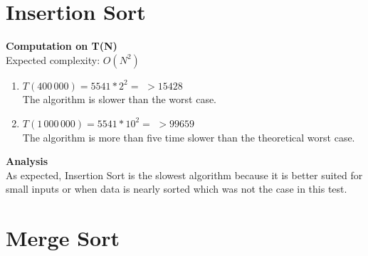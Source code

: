 \documentclass{article}
\begin{document}
\newpage
\section{Insertion Sort}

\begin{center}
\end{center}

\textbf{Computation on T(N)}\\

Expected complexity: $O(N^2)$\\

\begin{enumerate}
    \item $T(400\,000) = 5541 *2^2 =$
    $> 15428$\\
    The algorithm is slower than the worst case.
    
    \item $T(1\,000\,000) = 5541 *10^2 =$
    $> 99659$\\
    The algorithm is more than five time slower than the theoretical worst case.
    
\end{enumerate}

\textbf{Analysis}\\

As expected, Insertion Sort is the slowest algorithm  because it is better suited for small inputs or when data is nearly sorted which was not the case in this test.

\newpage
\section{Merge Sort}
\end{document}
